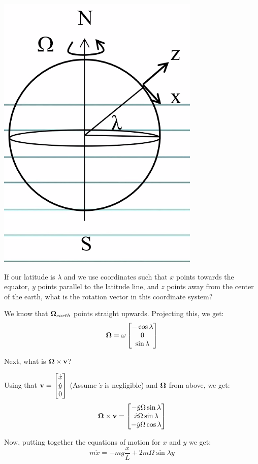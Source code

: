\begin{center}
    \includegraphics[scale=0.5]{Lecture-16/l16-img3.png}
\end{center}
If our latitude is $\lambda$ and we use coordinates such that $x$ points towards the equator, $y$ points parallel to the latitude line, and $z$ points away from the center of the earth, what is the rotation vector in this coordinate system?
\begin{s}
We know that $\mathbf{\Omega}_{earth}$ points straight upwards. Projecting this, we get:
\[\mathbf{\Omega} = \omega\begin{bmatrix}-\cos\lambda \\ 0 \\ \sin\lambda\end{bmatrix}\]
\end{s}
Next, what is $\mathbf{\Omega} \times \mathbf{v}$?
\begin{s}
Using that $\mathbf{v} = \begin{bmatrix}\dot{x} \\ \dot{y} \\ 0\end{bmatrix}$ (Assume $\dot{z}$ is negligible) and $\mathbf{\Omega}$ from above, we get:
\[\mathbf{\Omega} \times \mathbf{v} = \begin{bmatrix}-\dot{y}\Omega \sin\lambda \\ \dot{x}\Omega\sin\lambda \\ -\dot{y}\Omega\cos\lambda\end{bmatrix}\]
\end{s}
Now, putting together the equations of motion for $x$ and $y$ we get:
\[m\ddot{x} = -mg\frac{x}{L} + 2m\Omega\sin\lambda \dot{y}\]
